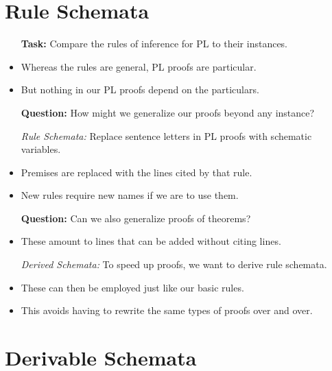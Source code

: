 \documentclass[a4paper, 11pt]{article} %
\begin{document}
\begin{multicols}{2}
\section*{Rule Schemata}

\begin{itemize}
  \item[\bf Task:] Compare the rules of inference for PL to their instances.
    \item Whereas the rules are general, PL proofs are particular.
    \item But nothing in our PL proofs depend on the particulars.
  \item[\bf Question:] How might we generalize our proofs beyond any instance?
  \item[\it Rule Schemata:] Replace sentence letters in PL proofs with schematic variables.
    \item Premises are replaced with the lines cited by that rule.
    \item New rules require new names if we are to use them.
  \item[\bf Question:] Can we also generalize proofs of theorems?
  \item These amount to lines that can be added without citing lines. 
  \item[\it Derived Schemata:] To speed up proofs, we want to derive rule schemata.
    \item These can then be employed just like our basic rules.
    \item This avoids having to rewrite the same types of proofs over and over.
\end{itemize}


\section*{Derivable Schemata}


\end{multicols}
\end{document}
